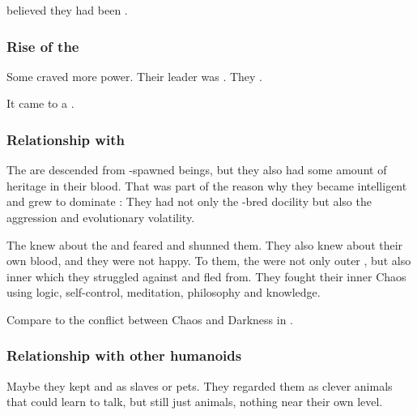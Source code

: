 \Sethicus believed they had been . 





\subsubsection{Rise of the \draecchonosh}
Some \ophidians{} craved more power. Their leader was \Tiamat. They . 

It came to a .





\subsubsection{Relationship with \XzaiShanns}
The \ophidians{} are descended from \voyager-spawned beings, but they also had some amount of \xsic{} heritage in their blood. 
That was part of the reason why they became intelligent and grew to dominate \Miith{}: 
They had not only the \voyager-bred docility but also the \xsic{} aggression and evolutionary volatility. 

The \ophidians{} knew about the \xss{} and feared and shunned them. 
They also knew about their own \xsic{} blood, and they were not happy. 
To them, the \xss{} were not only outer \daemons, but also inner \daemons{} which they struggled against and fled from. 
They fought their inner Chaos using logic, self-control, meditation, philosophy and knowledge. 

Compare to the conflict between Chaos and Darkness in \cite{StevenEriksonIanCameronEsslemont:MalazanBookoftheFallen}. 





\subsubsection{Relationship with other humanoids}
Maybe they kept \nephilim{} and \meccara{} as slaves or pets. 
They regarded them as clever animals that could learn to talk, but still just animals, nothing near their own level. 





